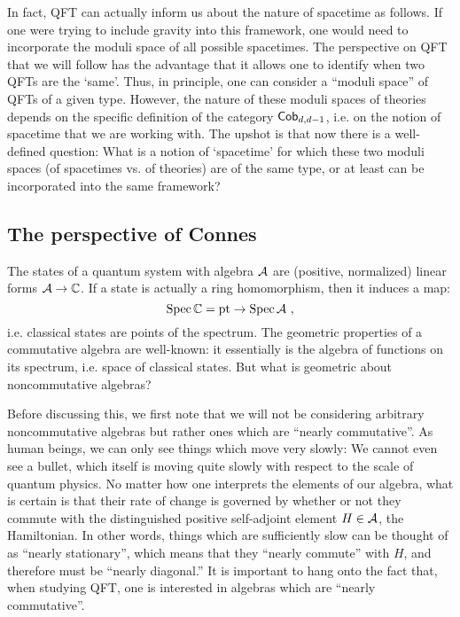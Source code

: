 In fact, QFT can actually inform us about the nature of spacetime as follows. 
If one were trying to include gravity into this framework, one would
need to incorporate the moduli space of all possible spacetimes. 
The perspective on QFT that we will follow has the advantage that it allows one to
identify when two QFTs are the `same'.
Thus, in principle, one can consider a ``moduli space'' of QFTs of a given type.
However, the nature of these moduli spaces of theories depends on the specific
definition of the category $\mathsf{Cob}_{d,d-1}$, i.e. on the notion of spacetime that we are
working with. 
The upshot is that now there is a well-defined question:
What is a notion of `spacetime' for which these two moduli spaces (of spacetimes vs. of
theories) are of the same type, or at least can be incorporated into the same framework?

\subsection{The perspective of Connes}


The states of a quantum system with algebra $\mathcal{A}$ are (positive, normalized) linear forms
$\mathcal{A} \to \mathbb{C}$.
If a state is actually a ring homomorphism, then it induces a map:
\begin{equation*}
\operatorname{Spec} \mathbb{C} = \operatorname{pt} \to \operatorname{Spec} \mathcal{A} \ ,
\end{equation*}
i.e. classical states are points of the spectrum.
The geometric properties of a commutative algebra are well-known: it essentially is the
algebra of functions on its spectrum, i.e. space of classical states. 
But what is geometric about noncommutative algebras?

Before discussing this, we first note that we will not be considering arbitrary
noncommutative algebras but rather ones which are ``nearly commutative''.
As human beings, we can only see things which move very slowly:
We cannot even see a bullet, which itself is moving quite slowly with respect to the
scale of quantum physics. 
No matter how one interprets the elements of our algebra, what is certain is that their
rate of change is governed by whether or not they commute with the
distinguished positive self-adjoint element $H\in \mathcal{A}$, the Hamiltonian.
In other words, things which are sufficiently slow can be thought of as ``nearly
stationary'', which means that they ``nearly commute'' with $H$, and therefore must be 
``nearly diagonal.''
It is important to hang onto the fact that, when studying QFT, one is interested in
algebras which are ``nearly commutative''.

